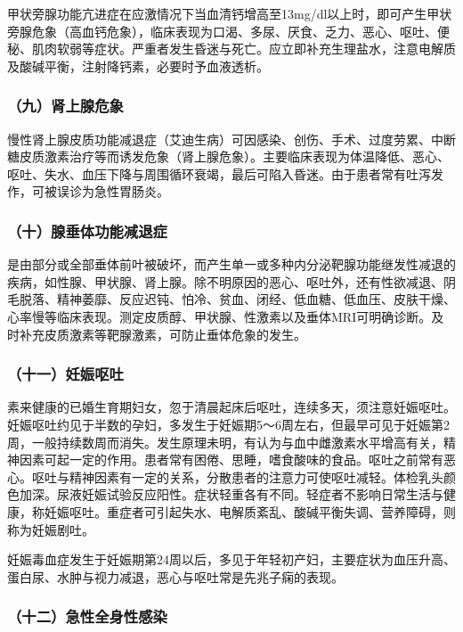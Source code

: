 甲状旁腺功能亢进症在应激情况下当血清钙增高至13mg/dl以上时，即可产生甲状旁腺危象（高血钙危象），临床表现为口渴、多尿、厌食、乏力、恶心、呕吐、便秘、肌肉软弱等症状。严重者发生昏迷与死亡。应立即补充生理盐水，注意电解质及酸碱平衡，注射降钙素，必要时予血液透析。

\subsubsection{（九）肾上腺危象}

慢性肾上腺皮质功能减退症（艾迪生病）可因感染、创伤、手术、过度劳累、中断糖皮质激素治疗等而诱发危象（肾上腺危象）。主要临床表现为体温降低、恶心、呕吐、失水、血压下降与周围循环衰竭，最后可陷入昏迷。由于患者常有吐泻发作，可被误诊为急性胃肠炎。

\subsubsection{（十）腺垂体功能减退症}

是由部分或全部垂体前叶被破坏，而产生单一或多种内分泌靶腺功能继发性减退的疾病，如性腺、甲状腺、肾上腺。除不明原因的恶心、呕吐外，还有性欲减退、阴毛脱落、精神萎靡、反应迟钝、怕冷、贫血、闭经、低血糖、低血压、皮肤干燥、心率慢等临床表现。测定皮质醇、甲状腺、性激素以及垂体MRI可明确诊断。及时补充皮质激素等靶腺激素，可防止垂体危象的发生。

\subsubsection{（十一）妊娠呕吐}

素来健康的已婚生育期妇女，忽于清晨起床后呕吐，连续多天，须注意妊娠呕吐。妊娠呕吐约见于半数的孕妇，多发生于妊娠期5～6周左右，但最早可见于妊娠第2周，一般持续数周而消失。发生原理未明，有认为与血中雌激素水平增高有关，精神因素可起一定的作用。患者常有困倦、思睡，嗜食酸味的食品。呕吐之前常有恶心。呕吐与精神因素有一定的关系，分散患者的注意力可使呕吐减轻。体检乳头颜色加深。尿液妊娠试验反应阳性。症状轻重各有不同。轻症者不影响日常生活与健康，称妊娠呕吐。重症者可引起失水、电解质紊乱、酸碱平衡失调、营养障碍，则称为妊娠剧吐。

妊娠毒血症发生于妊娠期第24周以后，多见于年轻初产妇，主要症状为血压升高、蛋白尿、水肿与视力减退，恶心与呕吐常是先兆子痫的表现。

\subsubsection{（十二）急性全身性感染}

